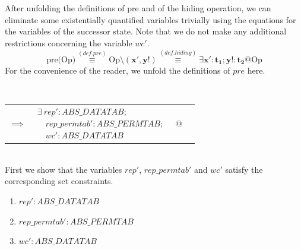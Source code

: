 %
%
After unfolding the definitions of pre and of the hiding operation, we can eliminate some existentially quantified variables trivially using the equations for the variables of the successor state. Note that we do not make any additional restrictions concerning the variable $wc'$. \\
%
%
\[
\mbox{pre(Op)} \stackrel{(def. pre)}{\equiv} \mbox{Op} \setminus (\mathbf{x'}, \mathbf{y!}) \stackrel{(def. hiding)}{\equiv} \exists \mathbf{x'} : \mathbf{t_1}; \mathbf{y!} : \mathbf{t_2} @ \mbox{Op}
\]
%
%
For the convenience of the reader, we unfold the definitions of $pre$ here.\\
%
%
  \begin{minipage}{6cm}
\end{minipage}\hfill\\[-.5cm]
\begin{tabular}{cccc}
{\Large$\implies$}&
$\begin{array}{l}
\exists~rep' : ABS\_DATATAB;\\
\quad rep\_permtab' : ABS\_PERMTAB;\\ 
\quad wc' : ABS\_DATATAB
\end{array}$
&$@$&
\parbox{3.8cm}{%
  }
\end{tabular}\\
First we show that the variables $rep'$, $rep\_permtab'$ and $wc'$ satisfy the
corresponding set constraints.\\
%
%
\begin{center}
  \begin{enumerate}
        \item $rep' : ABS\_DATATAB$
        \item $rep\_permtab' : ABS\_PERMTAB$
        \item $wc' : ABS\_DATATAB$
  \end{enumerate}
\end{center}

